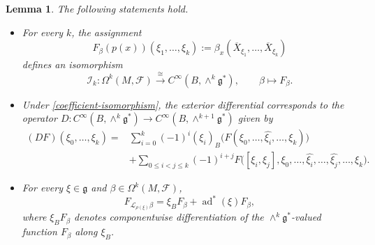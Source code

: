 \documentclass[reqno, 11pt]{amsart}
\newtheorem{lem}[thm]{Lemma}
\theoremstyle{definition}
\theoremstyle{property}
\theoremstyle{remark}
\numberwithin{equation}{section}
\begin{document}
\begin{lem}\label{coefficient-complex}
The following statements hold.
\begin{itemize}
\item[(a)] For every $k$, the assignment
\begin{equation}\label{coefficient-map}
F_\beta(p(x))(\xi_1,\dots,\xi_k)
:=
\beta_x(\overline X_{\xi_1},\dots,\overline X_{\xi_k})
\end{equation}
defines an isomorphism
\begin{equation}\label{coefficient-isomorphism}
\mathcal I_k:
\Omega^k(M,\mathcal F)
\xrightarrow{\;\cong\;}
C^\infty(B,\wedge^k\mathfrak g^*),
\qquad
\beta\longmapsto F_\beta.
\end{equation}

\item[(b)] Under \eqref{coefficient-isomorphism}, the exterior differential
corresponds to the operator
$
D:C^\infty(B,\wedge^k\mathfrak g^*)
\longrightarrow
C^\infty(B,\wedge^{k+1}\mathfrak g^*)$
given by
\begin{align}
(DF)(\xi_0,\dots,\xi_k)
={}&
\sum_{i=0}^k(-1)^i(\xi_i)_B
\bigl(
F(\xi_0,\dots,\widehat{\xi_i},\dots,\xi_k)
\bigr)
\nonumber\\
&+
\sum_{0\leq i<j\leq k}(-1)^{i+j}
F\bigl(
[\xi_i,\xi_j],
\xi_0,\dots,\widehat{\xi_i},\dots,
\widehat{\xi_j},\dots,\xi_k
\bigr).
\label{coefficient-differential}
\end{align}

\item[(c)] For every $\xi\in\mathfrak g$ and
$\beta\in\Omega^k(M,\mathcal F)$,
\begin{equation}\label{coefficient-lie-derivative}
F_{\mathcal L_{\rho(\xi)}\beta}
=
\xi_BF_\beta+\operatorname{ad}^*(\xi)F_\beta,
\end{equation}
where $\xi_BF_\beta$ denotes componentwise differentiation of the
$\wedge^k\mathfrak g^*$-valued function $F_\beta$ along $\xi_B$.
\end{itemize}
\end{lem}
\end{document}
